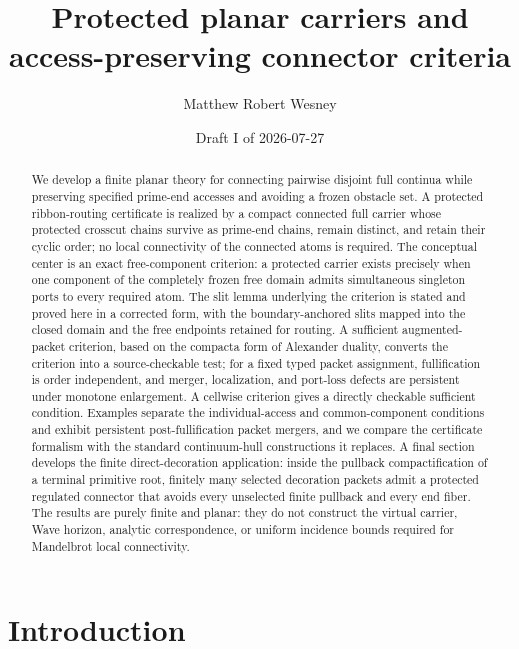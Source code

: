 \documentclass[11pt,reqno]{amsart}
\title[Protected planar carriers]{Protected planar carriers and\\access-preserving connector criteria}
\author{Matthew Robert Wesney}
\date{Draft I of 2026-07-27}
\theoremstyle{definition}
\theoremstyle{remark}
\begin{document}
\begin{abstract}
We develop a finite planar theory for connecting pairwise disjoint full
continua while preserving specified prime-end accesses and avoiding a frozen
obstacle set.  A protected ribbon-routing certificate is realized by a compact
connected full carrier whose protected crosscut chains survive as prime-end
chains, remain distinct, and retain their cyclic order; no local connectivity
of the connected atoms is required.  The conceptual center is an exact
free-component criterion: a protected carrier exists precisely when one
component of the completely frozen free domain admits simultaneous singleton
ports to every required atom.  The slit lemma underlying the criterion is
stated and proved here in a corrected form, with the boundary-anchored slits
mapped into the closed domain and the free endpoints retained for routing.  A
sufficient augmented-packet criterion, based on the compacta form of Alexander
duality, converts the criterion into a source-checkable test; for a fixed
typed packet assignment, fullification is order independent, and merger,
localization, and port-loss defects are persistent under monotone enlargement.
A cellwise criterion gives a directly checkable sufficient condition.
Examples separate the individual-access and common-component conditions and
exhibit persistent post-fullification packet mergers, and we compare the
certificate formalism with the standard continuum-hull constructions it
replaces.  A final section develops the finite direct-decoration application:
inside the pullback compactification of a terminal primitive root, finitely
many selected decoration packets admit a protected regulated connector that
avoids every unselected finite pullback and every end fiber.  The results are
purely finite and planar: they do not construct the virtual carrier, Wave
horizon, analytic correspondence, or uniform incidence bounds required for
Mandelbrot local connectivity.
\end{abstract}

\maketitle
\tableofcontents


\section{Introduction}\label{sec:intro}
\end{document}
